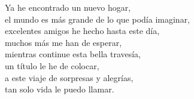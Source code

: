 \begin{center}
\vspace{1em} 
Ya he encontrado un nuevo hogar,\\ 
el mundo es más grande de lo que podía imaginar,\\ 
excelentes amigos he hecho hasta este día,\\ 
muchos más me han de esperar,\\ 
mientras continue esta bella travesía,\\ 
un título le he de colocar,\\ 
a este viaje de sorpresas y alegrías,\\ 
tan solo vida le puedo llamar.

\end{center}




